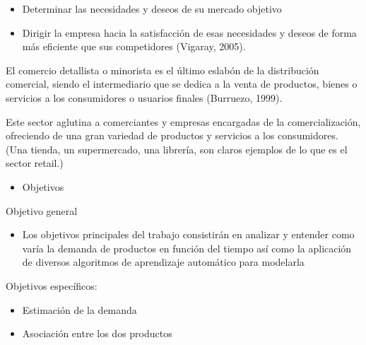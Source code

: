\documentclass[12pt,a4paper,]{book}
\def\ifdoblecara{} %
\providecommand{\tightlist}{%
  \setlength{\itemsep}{0pt}\setlength{\parskip}{0pt}}
\numberwithin{dummy}{section}
\theoremstyle{ocrenumbox}
\theoremstyle{blacknumex}
\theoremstyle{blacknumbox}
\theoremstyle{ocrenum}
\theoremstyle{ocrenum}
\begin{document}
\begin{itemize}
\tightlist
\item
  Determinar las necesidades y deseos de su mercado objetivo
\item
  Dirigir la empresa hacia la satisfacción de esas necesidades y deseos
  de forma más eficiente que sus competidores (Vigaray, 2005).
\end{itemize}

El comercio detallista o minorista es el último eslabón de la
distribución comercial, siendo el intermediario que se dedica a la venta
de productos, bienes o servicios a los consumidores o usuarios finales
(Burruezo, 1999).

Este sector aglutina a comerciantes y empresas encargadas de la
comercialización, ofreciendo de una gran variedad de productos y
servicios a los consumidores. (Una tienda, un supermercado, una
librería, son claros ejemplos de lo que es el sector retail.)

\begin{itemize}
\tightlist
\item
  Objetivos
\end{itemize}

Objetivo general

\begin{itemize}
\tightlist
\item
  Los objetivos principales del trabajo consistirán en analizar y
  entender como varía la demanda de productos en función del tiempo así
  como la aplicación de diversos algoritmos de aprendizaje automático
  para modelarla
\end{itemize}

Objetivos específicos:

\begin{itemize}
\tightlist
\item
  Estimación de la demanda
\item
  Asociación entre los dos productos
\end{itemize}

\cleardoublepage   
\listoffigures
{}

\cleardoublepage

\listoftables


\cleardoublepage


\ifdefined\ifdoblecara
\fancyhead[LE,RO]{\scriptsize\rightmark}
\fancyfoot[LO,RE]{\scriptsize\slshape \leftmark}
\fancyfoot[C]{}
\fancyfoot[LE,RO]{\footnotesize\thepage}
\else
\fancyhead[RO]{\scriptsize\rightmark}
\fancyfoot[LO]{\scriptsize\slshape \leftmark}
\fancyfoot[C]{}
\fancyfoot[RO]{\footnotesize\thepage}
\fi
\end{document}
